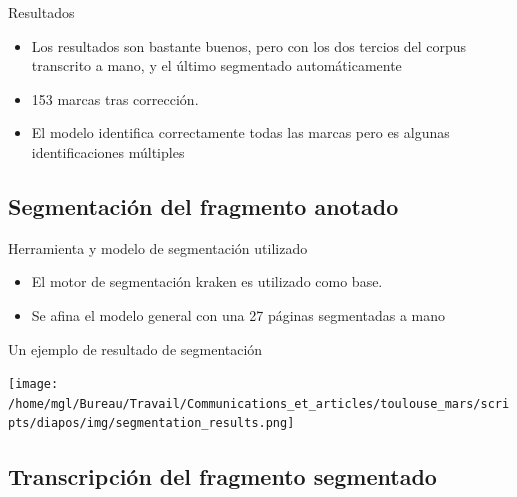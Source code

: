 \documentclass[11pt,aspectratio=169]{beamer}
\begin{document}
\begin{frame}{Resultados}
\begin{itemize}
\item Los resultados son bastante buenos, pero con los dos tercios del corpus transcrito a mano, y el último segmentado automáticamente
\item 153 marcas tras corrección. 
\item El modelo identifica correctamente todas las marcas pero es algunas identificaciones múltiples
\end{itemize}
\end{frame}


\subsection{Segmentación del fragmento anotado}

\begin{frame}{Herramienta y modelo de segmentación utilizado}
\begin{itemize}
\item El motor de segmentación kraken es utilizado como base. 
\item Se afina el modelo general con una 27 páginas segmentadas a mano
\end{itemize}
\end{frame}

\begin{frame}{Un ejemplo de resultado de segmentación}
\begin{center}
\texttt{[image: /home/mgl/Bureau/Travail/Communications\_et\_articles/toulouse\_mars/scripts/diapos/img/segmentation\_results.png]}
\end{center}
\end{frame}


\subsection{Transcripción del fragmento segmentado}
\end{document}
